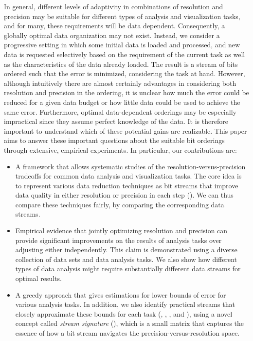 In general, different levels of adaptivity in combinations of resolution and precision may be
suitable for different types of analysis and visualization tasks, and for many, these requirements
will be data dependent. Consequently, a globally optimal data organization may not exist. Instead,
we consider a progressive setting in which some initial data is loaded and processed, and new data
is requested selectively based on the requirement of the current task as well as the characteristics
of the data already loaded. The result is a stream of bits ordered such that the error is minimized,
considering the task at hand. However, although intuitively there are almost certainly advantages in
considering both resolution and precision in the ordering, it is unclear how much the error could be
reduced for a given data budget or how little data could be used to achieve the same error.
Furthermore, optimal data-dependent orderings may be especially impractical since they assume
perfect knowledge of the data. It is therefore important to understand which of these potential
gains are realizable. This paper aims to answer these important questions about the suitable bit orderings through extensive,
empirical experiments. In particular, our contributions are:

\begin{itemize}
%
\item A framework that allows systematic studies of the resolution-versus-precision tradeoffs for
common data analysis and visualization tasks. The core idea is to represent various data reduction
techniques as bit streams that improve data quality in either resolution or precision in each step
(). We can thus compare these techniques fairly, by comparing the
corresponding data streams.
%  
\item {} Empirical evidence that jointly optimizing resolution and precision can provide significant
improvements on the results of analysis tasks over adjusting either independently. This claim is
demonstrated using a diverse collection of data sets and data analysis tasks. We also show how
different types of data analysis might require substantially different data streams for optimal
results.
%
\item A greedy approach that gives estimations for lower bounds of error for various analysis tasks.
In addition, we also identify practical streams that closely approximate these bounds for each task
(, , , and
), using a novel concept called \emph{stream signature}
(), which is a small matrix that captures the essence of how a bit stream
navigates the precision-versus-resolution space.
\end{itemize}


